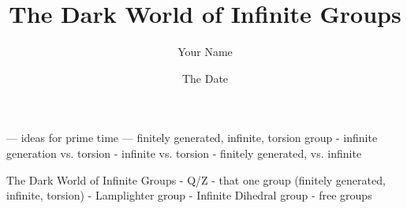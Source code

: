 \documentclass[12pt]{article}
\title{The Dark World of Infinite Groups}
\author{Your Name}
\date{The Date} %
\begin{document}
\maketitle

--- ideas for prime time ---
finitely generated, infinite, torsion group
- infinite generation vs. torsion
- infinite vs. torsion 
- finitely generated, vs. infinite

The Dark World of Infinite Groups
- Q/Z
- that one group (finitely generated, infinite, torsion)
- Lamplighter group
- Infinite Dihedral group
- free groups
\end{document}
